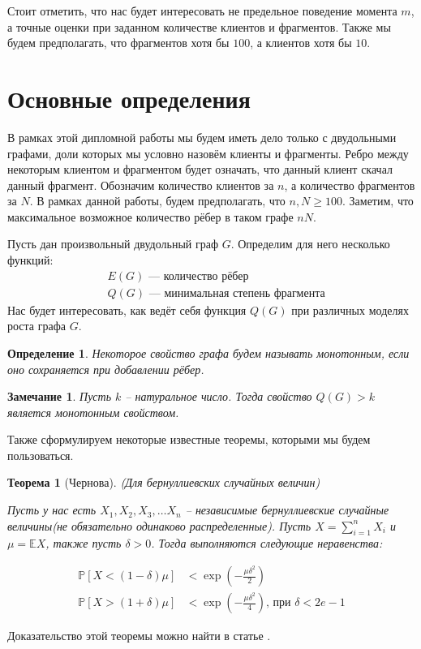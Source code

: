 \documentclass{matmex-diploma-custom}
\newcommand{\Expect}{\mathbb E}
\newcommand{\PRob}{\mathbb P}
\newcommand{\geqs}{\geqslant}
\newtheorem{note}{Замечание}
\newtheorem{define}{Определение}
\theoremstyle{named}
\newtheorem*{namedtheorem}{Теорема}
\begin{document}
Стоит отметить, что нас будет интересовать не предельное поведение момента $m$, а точные оценки при заданном количестве клиентов
и фрагментов. Также мы будем предполагать, что фрагментов хотя бы $100$, а клиентов хотя бы $10$.

\section*{Основные определения}
В рамках этой дипломной работы мы будем иметь дело только с двудольными графами, доли которых мы условно назовём клиенты и фрагменты.
Ребро между некоторым клиентом и фрагментом будет означать, что данный клиент скачал данный фрагмент.
Обозначим количество клиентов за $n$, а количество фрагментов за $N$. В рамках данной работы, будем предполагать, что $n, N \geqs 100$.
Заметим, что максимальное возможное количество рёбер в таком графе $nN$.

Пусть дан произвольный двудольный граф $G$. Определим для него несколько функций:
\begin{align*}
&E(G) \text{ --- количество рёбер}\\
&Q(G) \text{ --- минимальная степень фрагмента}
\end{align*}
Нас будет интересовать, как ведёт себя функция $Q(G)$ при различных моделях роста графа $G$.

\begin{define}
Некоторое свойство графа будем называть монотонным, если оно сохраняется при добавлении рёбер.
\end{define}

\begin{note}
Пусть $k$ -- натуральное число. Тогда свойство $Q(G) > k$ является монотонным свойством.
\end{note}

Также сформулируем некоторые известные теоремы, которыми мы будем пользоваться.
\begin{namedtheorem}[Чернова] (Для бернуллиевских случайных величин) \label{Cher} 

Пусть у нас есть $X_1, X_2, X_3, \dots X_n$ -- 
независимые бернуллиевские случайные величины(не обязательно одинаково распределенные). Пусть $X = \sum\limits_{i = 1}^n X_i$ и
$\mu = \Expect X$, также пусть $\delta > 0$. Тогда выполняются следующие неравенства:

\begin{align}
\PRob[X < (1-\delta)\mu] &< \exp\left(- \frac{\mu \delta^2}{2} \right)
\\
\PRob[X > (1+\delta)\mu] &< \exp\left(- \frac{\mu \delta^2}{4} \right) \text{, при } \delta < 2e - 1
\end{align}
\end{namedtheorem}
Доказательство этой теоремы можно найти в статье \cite{chernov}.
\end{document}
